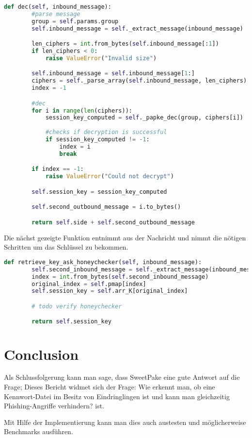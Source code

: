 \documentclass[conference, compsoc]{IEEEtran}
\begin{document}
\begin{lstlisting}[language=Python]
def dec(self, inbound_message):
        #parse message
        group = self.params.group
        self.inbound_message = self._extract_message(inbound_message)

        len_ciphers = int.from_bytes(self.inbound_message[:1])
        if len_ciphers < 0:
            raise ValueError("Invalid size")

        self.inbound_message = self.inbound_message[1:]
        ciphers = self._parse_array(self.inbound_message, len_ciphers)
        index = -1

        #dec
        for i in range(len(ciphers)):
            session_key_computed = self._papke_dec(group, ciphers[i])
            
            #checks if decryption is successful
            if session_key_computed != -1:
                index = i
                break

        if index == -1:
            raise ValueError("Could not decrypt")

        self.session_key = session_key_computed

        self.second_outbound_message = i.to_bytes()

        return self.side + self.second_outbound_message

\end{lstlisting}

Die nächst gezeigte Funktion entnimmt aus der Nachricht und nimmt die nötigen Schritten
um das Schlüssel zu bekommen.

\begin{lstlisting}[language=Python]
def retrieve_key_ask_honeychecker(self, inbound_message):
        self.second_inbound_message = self._extract_message(inbound_message)
        index = int.from_bytes(self.second_inbound_message)
        original_index = self.pmap[index]
        self.session_key = self.arr_K[original_index]

        # todo verify honeychecker

        return self.session_key
\end{lstlisting}

\section{Conclusion}
Als Schlussfolgerung kann man sage, dass SweetPake eine gute Antwort auf die
Frage; Dieses Bericht widmet sich der Frage: Wie erkennt man, ob eine
Kennwort-Datei im Besitz von Eindringlingen ist und kann man gleichzeitig
Phishing-Angriffe verhindern? ist.

Mit Hilfe der Implementierung kann man dies auch austesten und möglicherweise
Benchmarks ausführen.

\printbibliography
\end{document}
